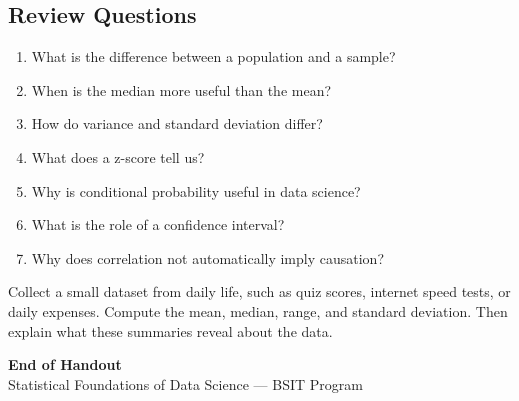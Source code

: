 \documentclass[11pt,a4paper]{article}
\begin{document}
\subsection{Review Questions}

\begin{enumerate}[leftmargin=*]
  \item What is the difference between a population and a sample?
  \item When is the median more useful than the mean?
  \item How do variance and standard deviation differ?
  \item What does a z-score tell us?
  \item Why is conditional probability useful in data science?
  \item What is the role of a confidence interval?
  \item Why does correlation not automatically imply causation?
\end{enumerate}

\begin{examplebox}
Collect a small dataset from daily life, such as quiz scores, internet speed tests, or daily expenses. Compute the mean, median, range, and standard deviation. Then explain what these summaries reveal about the data.
\end{examplebox}

\vfill
\begin{center}
{\large\textcolor{primary}{\textbf{End of Handout}}}\\[4pt]
{\small\textcolor{gray!70!black}{Statistical Foundations of Data Science --- BSIT Program}}
\end{center}
\end{document}
